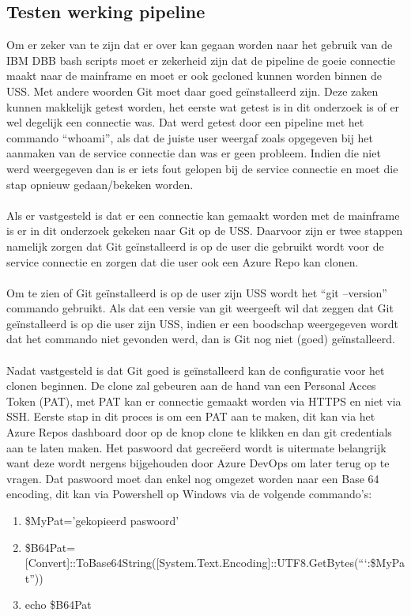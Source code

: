 \subsection{Testen werking pipeline}
Om er zeker van te zijn dat er over kan gegaan worden naar het gebruik van de IBM DBB bash scripts moet er zekerheid zijn dat de pipeline de goeie connectie maakt naar de mainframe en moet er ook gecloned kunnen worden binnen de USS. Met andere woorden Git moet daar goed geïnstalleerd zijn. Deze zaken kunnen makkelijk getest worden, het eerste wat getest is in dit onderzoek is of er wel degelijk een connectie was. Dat werd getest door een pipeline met het commando \enquote{whoami}, als dat de juiste user weergaf zoals opgegeven bij het aanmaken van de service connectie dan was er geen probleem. Indien die niet werd weergegeven dan is er iets fout gelopen bij de service connectie en moet die stap opnieuw gedaan/bekeken worden. 
\\ \\
Als er vastgesteld is dat er een connectie kan gemaakt worden met de mainframe is er in dit onderzoek gekeken naar Git op de USS. Daarvoor zijn er twee stappen namelijk zorgen dat Git geïnstalleerd is op de user die gebruikt wordt voor de service connectie en zorgen dat die user ook een Azure Repo kan clonen. 
\\ \\
Om te zien of Git geïnstalleerd is op de user zijn USS wordt het \enquote{git --version} commando gebruikt. Als dat een versie van git weergeeft wil dat zeggen dat Git geïnstalleerd is op die user zijn USS, indien er een boodschap weergegeven wordt dat het commando niet gevonden werd, dan is Git nog niet (goed) geïnstalleerd. 
\\ \\ 
Nadat vastgesteld is dat Git goed is geïnstalleerd kan de configuratie voor het clonen beginnen. De clone zal gebeuren aan de hand van een Personal Acces Token (PAT), met PAT kan er connectie gemaakt worden via HTTPS en niet via SSH. Eerste stap in dit proces is om een PAT aan te maken, dit kan via het Azure Repos dashboard door op de knop clone te klikken en dan git credentials aan te laten maken. Het paswoord dat gecreëerd wordt is uitermate belangrijk want deze wordt nergens bijgehouden door Azure DevOps om later terug op te vragen. Dat paswoord moet dan enkel nog omgezet worden naar een Base 64 encoding, dit kan via Powershell op Windows via de volgende commando's:
\begin{enumerate}
    \item \$MyPat='gekopieerd paswoord'
    \item \$B64Pat=[Convert]::ToBase64String([System.Text.Encoding]::UTF8.GetBytes(\textquotedblleft`:\$MyPat\textquotedblright))
    \item echo \$B64Pat
\end{enumerate}
